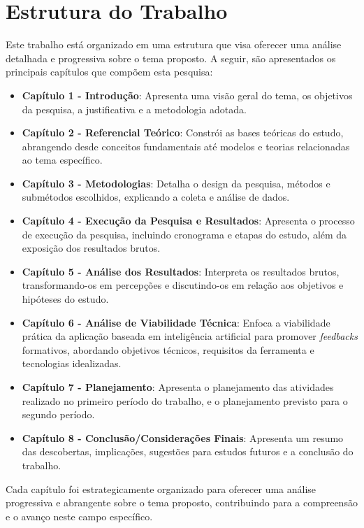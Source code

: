 \section{Estrutura do Trabalho}

Este trabalho está organizado em uma estrutura que visa oferecer uma análise detalhada e progressiva sobre o tema proposto. A seguir, são apresentados os principais capítulos que compõem esta pesquisa:

\begin{itemize}
    \item \textbf{Capítulo 1 - Introdução}: Apresenta uma visão geral do tema, os objetivos da pesquisa, a justificativa e a metodologia adotada.
    
    \item \textbf{Capítulo 2 - Referencial Teórico}: Constrói as bases teóricas do estudo, abrangendo desde conceitos fundamentais até modelos e teorias relacionadas ao tema específico.
    
    \item \textbf{Capítulo 3 - Metodologias}: Detalha o design da pesquisa, métodos e submétodos escolhidos, explicando a coleta e análise de dados.
    
    \item \textbf{Capítulo 4 - Execução da Pesquisa e Resultados}: Apresenta o processo de execução da pesquisa, incluindo cronograma e etapas do estudo, além da exposição dos resultados brutos.
    
    \item \textbf{Capítulo 5 - Análise dos Resultados}: Interpreta os resultados brutos, transformando-os em percepções e discutindo-os em relação aos objetivos e hipóteses do estudo.
    
    \item \textbf{Capítulo 6 - Análise de Viabilidade Técnica}: Enfoca a viabilidade prática da aplicação baseada em inteligência artificial para promover \textit{feedbacks} formativos, abordando objetivos técnicos, requisitos da ferramenta e tecnologias idealizadas.
    
    \item \textbf{Capítulo 7 - Planejamento}: Apresenta o planejamento das atividades realizado no primeiro período do trabalho, e o planejamento previsto para o segundo período.

    \item \textbf{Capítulo 8 - Conclusão/Considerações Finais}: Apresenta um resumo das descobertas, implicações, sugestões para estudos futuros e a conclusão do trabalho.
\end{itemize}

Cada capítulo foi estrategicamente organizado para oferecer uma análise progressiva e abrangente sobre o tema proposto, contribuindo para a compreensão e o avanço neste campo específico.

